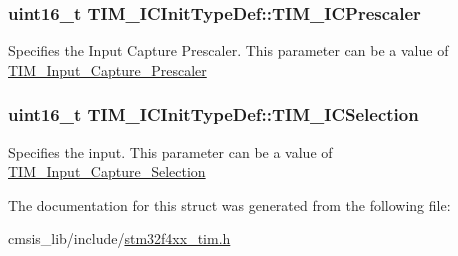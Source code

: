 \subsubsection[{\texorpdfstring{T\+I\+M\+\_\+\+I\+C\+Prescaler}{TIM_ICPrescaler}}]{\setlength{\rightskip}{0pt plus 5cm}uint16\+\_\+t T\+I\+M\+\_\+\+I\+C\+Init\+Type\+Def\+::\+T\+I\+M\+\_\+\+I\+C\+Prescaler}\hypertarget{struct_t_i_m___i_c_init_type_def_ac61c7fc999ace295ac81b304cabd61e0}{}\label{struct_t_i_m___i_c_init_type_def_ac61c7fc999ace295ac81b304cabd61e0}
Specifies the Input Capture Prescaler. This parameter can be a value of \hyperlink{group___t_i_m___input___capture___prescaler}{T\+I\+M\+\_\+\+Input\+\_\+\+Capture\+\_\+\+Prescaler} 
\subsubsection[{\texorpdfstring{T\+I\+M\+\_\+\+I\+C\+Selection}{TIM_ICSelection}}]{\setlength{\rightskip}{0pt plus 5cm}uint16\+\_\+t T\+I\+M\+\_\+\+I\+C\+Init\+Type\+Def\+::\+T\+I\+M\+\_\+\+I\+C\+Selection}\hypertarget{struct_t_i_m___i_c_init_type_def_a00b9a72e895a43dc18c69c96a149f080}{}\label{struct_t_i_m___i_c_init_type_def_a00b9a72e895a43dc18c69c96a149f080}
Specifies the input. This parameter can be a value of \hyperlink{group___t_i_m___input___capture___selection}{T\+I\+M\+\_\+\+Input\+\_\+\+Capture\+\_\+\+Selection} 

The documentation for this struct was generated from the following file\+:\begin{DoxyCompactItemize}
\item 
cmsis\+\_\+lib/include/\hyperlink{stm32f4xx__tim_8h}{stm32f4xx\+\_\+tim.\+h}\end{DoxyCompactItemize}
